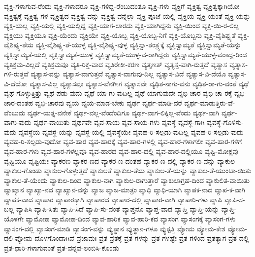 {ವ್ಯಕ್ತಿ-ಗಳಾಗುವ-ರೆಂದು
ವ್ಯಕ್ತಿ-ಗಳಾದರೂ
ವ್ಯಕ್ತಿ-ಗಳಿದ್ದ-ರೆಂಬುದಂತೂ
ವ್ಯಕ್ತಿ-ಗಳು
ವ್ಯಕ್ತಿಗೆ
ವ್ಯಕ್ತಿತ್ವ
ವ್ಯಕ್ತಿತ್ವಕ್ಕಾಗಿಯೋ
ವ್ಯಕ್ತಿತ್ವಕ್ಕೆ
ವ್ಯಕ್ತಿತ್ವ-ಗಳ
ವ್ಯಕ್ತಿತ್ವದ
ವ್ಯಕ್ತಿತ್ವ-ವನ್ನು
ವ್ಯಕ್ತಿತ್ವ-ವನ್ನೆಲ್ಲಾ
ವ್ಯಕ್ತಿ-ಪೂಜೆ-ಯಲ್ಲಿ
ವ್ಯಕ್ತಿಯ
ವ್ಯಕ್ತಿ-ಯಂತೆ
ವ್ಯಕ್ತಿ-ಯನ್ನು
ವ್ಯಕ್ತಿ-ಯಲ್ಲ
ವ್ಯಕ್ತಿ-ಯಲ್ಲಿ
ವ್ಯಕ್ತಿ-ಯಲ್ಲಿದ್ದ
ವ್ಯಕ್ತಿ-ಯಾಗ-ಲಾರದು
ವ್ಯಕ್ತಿ-ಯಾಗಿದ್ದನು
ವ್ಯಕ್ತಿ-ಯಿಂದ
ವ್ಯಕ್ತಿ-ಯಿ-ರ-ಲಿಲ್ಲ
ವ್ಯಕ್ತಿಯು
ವ್ಯಕ್ತಿಯೂ
ವ್ಯಕ್ತಿ-ಯೆಂದು
ವ್ಯಕ್ತಿಯೇ
ವ್ಯಕ್ತಿ-ಯೊಬ್ಬ
ವ್ಯಕ್ತಿ-ಯೊಬ್ಬ-ನಿಗೆ
ವ್ಯಕ್ತಿ-ಯೊಬ್ಬನು
ವ್ಯಕ್ತಿ-ವೈಶಿಷ್ಟ್ಯತೆ
ವ್ಯಕ್ತಿ-ವೈಶಿಷ್ಟ್ಯ-ತೆಯ
ವ್ಯಕ್ತಿ-ವೈಶಿಷ್ಟ್ಯ-ತೆ-ಯುಳ್ಳ
ವ್ಯಕ್ತಿ-ವೈಶಿಷ್ಟ್ಯ-ವುಳ್ಳ
ವ್ಯಕ್ತಿಸ್ವಾ-ತಂತ್ರ್ಯಕ್ಕೆ
ವ್ಯಕ್ತಿಸ್ವಾಮ್ಯತೆ
ವ್ಯಕ್ತಿಸ್ವಾಮ್ಯತೆ-ಯನ್ನು
ವ್ಯಕ್ತಿಸ್ವಾಮ್ಯತೆ-ಯಲ್ಲಿ
ವ್ಯಕ್ತಿಸ್ವಾಮ್ಯತೆ-ಯುಳ್ಳ
ವ್ಯಕ್ತಿಸ್ವಾಮ್ಯತೆ-ಯುಳ್ಳ-ವ-ರಾಗಿದ್ದರು
ವ್ಯಕ್ತಿಸ್ವಾಮ್ಯತೆ-ಯುಳ್ಳ-ವರಾದ್ದ-ರಿಂದ
ವ್ಯತಿಕ್ರಮ-ವಿಲ್ಲದೆ
ವ್ಯತಿಕ್ರಮವೂ
ವ್ಯತಿ-ರಿಕ್ತ-ವಾದ
ವ್ಯತಿರೇಕೀ-ಕರಣ
ವ್ಯತೃಣತ್
ವ್ಯತ್ಯಸ್ತ-ವಾಗಿ-ರುತ್ತದೆ
ವ್ಯತ್ಯಾಸ
ವ್ಯತ್ಯಾಸ-ಗಳಿ-ರುತ್ತವೆ
ವ್ಯತ್ಯಾಸ-ವನ್ನು
ವ್ಯತ್ಯಾಸ-ವಾಗುತ್ತದೆ
ವ್ಯತ್ಯಾಸ-ವಾಗುವು-ದಿಲ್ಲ
ವ್ಯತ್ಯಾಸ-ವಿದೆ
ವ್ಯತ್ಯಾಸ-ವಿ-ದೆಯೊ
ವ್ಯತ್ಯಾಸ-ವಿ-ದೆಯೋ
ವ್ಯತ್ಯಾಸ-ವಿಲ್ಲ
ವ್ಯತ್ಯಾಸವೂ
ವ್ಯತ್ಯಾಸ-ವೆನಗೀಗ
ವ್ಯತ್ಯಾಸವೇ
ವ್ಯಥಿತ-ನಾಗು-ವನು
ವ್ಯಥಿತ-ರಾ-ಗು-ವಂತೆ
ವ್ಯಥೆ
ವ್ಯಥೆ-ಗೊಳ್ಳುತ್ತಿತ್ತು
ವ್ಯಥೆ-ಪಡು-ವುದು
ವ್ಯಥೆ-ಯಾ-ಗು-ವುದಿಲ್ಲ
ವ್ಯಥೆ-ಯಾಗುವುದೇ
ವ್ಯಭಿ-ಚಾರ
ವ್ಯಭಿ-ಚಾ-ರಕ್ಕೆ
ವ್ಯಭಿ-ಚಾರ-ದಂತಹ
ವ್ಯಭಿ-ಚಾರವು
ವ್ಯಯ
ವ್ಯಯ-ಮಾಡ-ಬೇಕು
ವ್ಯರ್ಥ
ವ್ಯರ್ಥ-ಮಾಡಿ-ದರೆ
ವ್ಯರ್ಥ-ಮಾಡುತ್ತಿರು-ವೆ-ವೆಂಬುದು
ವ್ಯರ್ಥ-ಯತ್ನ-ವನೇಕೆ
ವ್ಯರ್ಥ-ವಲ್ಲ-ವೆಂದೆಂದಿಗೂ
ವ್ಯರ್ಥ-ವಾಗ-ಲಿಕ್ಕಿಲ್ಲ-ವೆಂದು
ವ್ಯರ್ಥ-ವಾಗಿ
ವ್ಯರ್ಥ-ವಾಗು-ವುದು
ವ್ಯರ್ಥ-ವಾಯಿತು
ವ್ಯರ್ಥವೇ
ವ್ಯವ-ಸಾಯ
ವ್ಯವ-ಸಾಯ-ಗಳು
ವ್ಯವಸ್ಥೆ
ವ್ಯವಸ್ಥೆ-ಗಾಗಿ
ವ್ಯವಸ್ಥೆ-ಗೊಳಿಸು-ವುದು
ವ್ಯವಸ್ಥೆಯ
ವ್ಯವಸ್ಥೆ-ಯನ್ನು
ವ್ಯವಸ್ಥೆ-ಯಲ್ಲಿ
ವ್ಯವಸ್ಥೆಯೇ
ವ್ಯವಹ-ರಿ-ಸಲ್ಪಡು-ವುದಿಲ್ಲ
ವ್ಯವಹ-ರಿ-ಸಲ್ಪಡು-ವುದು
ವ್ಯವಹ-ರಿ-ಸಲ್ಪಡು-ವುದೋ
ವ್ಯವ-ಹಾರ
ವ್ಯವ-ಹಾರಕ್ಕೆ
ವ್ಯವ-ಹಾರ-ಗಳಲ್ಲಿ
ವ್ಯವ-ಹಾರ-ಗಳಾಗಲೀ
ವ್ಯವ-ಹಾರ-ಗಳಿಗೆ
ವ್ಯವ-ಹಾರ-ಗಳು
ವ್ಯವ-ಹಾರ-ಗಳೆಲ್ಲವೂ
ವ್ಯವ-ಹಾರದ
ವ್ಯವ-ಹಾರ-ದಲ್ಲಿ
ವ್ಯವ-ಹಾರ-ದಲ್ಲಿಯೂ
ವ್ಯಷ್ಟಿ-ಮೋಕ್ಷವು
ವ್ಯಷ್ಟಿಯೂ
ವ್ಯಷ್ಟಿಯೇ
ವ್ಯಾಕರಣ
ವ್ಯಾಕರ-ಣದ
ವ್ಯಾಕರ-ಣ-ದಂತಹ
ವ್ಯಾಕರ-ಣ-ದಲ್ಲಿ
ವ್ಯಾಕರ-ಣ-ವನ್ನು
ವ್ಯಾಕುಲ
ವ್ಯಾಕುಲ-ಗೊಂಡು
ವ್ಯಾಕುಲ-ಗೊಳ್ಳುತ್ತದೆ
ವ್ಯಾಕುಲತೆ
ವ್ಯಾಕುಲ-ತೆಯ
ವ್ಯಾಕುಲ-ತೆ-ಯನ್ನು
ವ್ಯಾಕುಲ-ತೆ-ಯುಂಟಾ-ಯಿತು
ವ್ಯಾಕುಲ-ತೆ-ಯೆಂದು
ವ್ಯಾಕುಲ-ದಿಂದ
ವ್ಯಾಕುಲ-ನಾಗಿ
ವ್ಯಾಕುಲ-ರಾಗುತ್ತಾರೆ
ವ್ಯಾಕುಲಾಗ್ರಹ-ದಿಂದ
ವ್ಯಾಕುಲಿತ-ವಾಯಿತು
ವ್ಯಾಖ್ಯಾನ
ವ್ಯಾಖ್ಯಾ-ನದ
ವ್ಯಾಖ್ಯಾನ-ವನ್ನು
ವ್ಯಾಜ
ವ್ಯಾಜ-ಮಾತ್ರಂ
ವ್ಯಾಧಿ
ವ್ಯಾಧಿ-ಯಾಗಿ
ವ್ಯಾಪಕ-ನಾದ
ವ್ಯಾಪ-ಕ-ವಾಗಿ
ವ್ಯಾಪಕ-ವಾದ
ವ್ಯಾಪಾರ
ವ್ಯಾಪಾರಕ್ಕಾಗಿ
ವ್ಯಾಪಾರದ
ವ್ಯಾಪಾರ-ದಲ್ಲಿ
ವ್ಯಾಪಾರ-ವಾಗಿ
ವ್ಯಾಪಾರಿ-ಗಳು
ವ್ಯಾಪಿ
ವ್ಯಾಪಿ-ಸ-ಬಲ್ಲ
ವ್ಯಾಪಿಸಿ
ವ್ಯಾಪಿ-ಸಿತು
ವ್ಯಾಪಿ-ಸಿದೆ
ವ್ಯಾಪಿ-ಸು-ವಂತೆ
ವ್ಯಾಪ್ತನೊ
ವ್ಯಾಪ್ತ-ವಾದ
ವ್ಯಾಪ್ತಿ
ವ್ಯಾಪ್ತಿ-ಯನ್ನು
ವ್ಯಾಪ್ತಿ-ಯೊಳಗೇ
ವ್ಯಾಮೋಹ
ವ್ಯಾಮೋಹ-ದಿಂದ
ವ್ಯಾವ-ಹಾರಿಕ
ವ್ಯಾವ-ಹಾರಿ-ಕದ
ವ್ಯಾಸಂಗ
ವ್ಯಾಸಂಗಕ್ಕೆ
ವ್ಯಾಸಂಗ-ಗಳು
ವ್ಯಾಸಂಗ-ದಲ್ಲಿ
ವ್ಯಾಸಂಗ-ಮಾಡಿ
ವ್ಯಾಸಂಗ-ವನ್ನು
ವ್ಯುತ್ಥಾನ
ವ್ಯುತ್ಥಾನ-ಗಳೂ
ವ್ಯುತ್ಪತ್ತಿ
ವ್ಯೋಮ
ವ್ಯೋಮ-ಕೇಶ
ವ್ಯೋಮ-ದಲಿ
ವ್ಯೋಮ-ದೊಳಗೊಂದಾಗಿವೆ
ವ್ರಜಾಮಃ
ವ್ರತ
ವ್ರತಕ್ಕೆ
ವ್ರತ-ಗಳನ್ನು
ವ್ರತ-ಗಳಷ್ಟೇ
ವ್ರತ-ಗಳಿಂದ
ವ್ರತತ್ಯಾಗ
ವ್ರತ-ದಲ್ಲಿ
ವ್ರತ-ಧಾರಿ-ಗಳಾಗುವಂತೆ
ವ್ರತ-ವನ್ನವ-ಲಂಬಿಸಿ-ಕೊಂಡು
}
